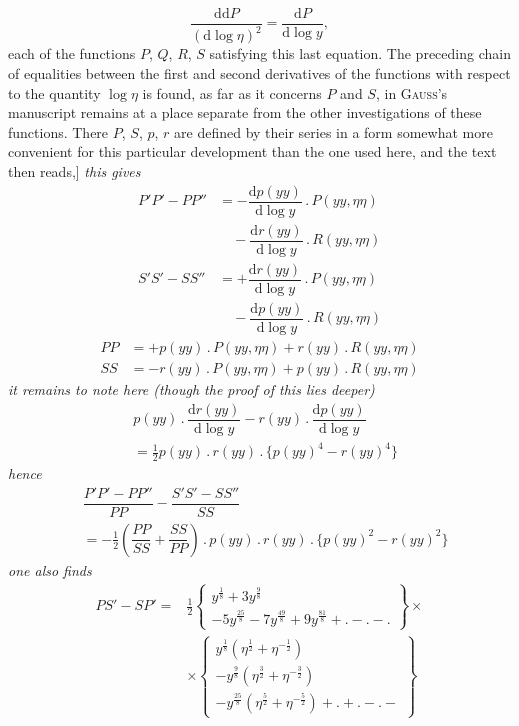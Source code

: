 
\[
\dfrac{\mathrm d\mathrm dP}{(\mathrm d\log\eta)^2}
 =\dfrac{\mathrm dP}{\mathrm d\log y},
\]
each of the functions $P$, $Q$, $R$, $S$ satisfying this last equation. The preceding chain of equalities between the first and second derivatives of the functions with respect to the quantity $\log\eta$ is found, as far as it concerns $P$ and $S$, in \textsc{Gauss}'s manuscript remains at a place separate from the other investigations of these functions. There $P$, $S$, $p$, $r$ are defined by their series in a form somewhat more convenient for this particular development than the one used here, 
and the text then reads,] \textit{this gives}
\[
\begin{aligned}
P'P'-PP''&=-\dfrac{\mathrm dp(yy)}{\mathrm d\log y}\mathbin{.}P(yy,\eta\eta)\\[5pt]&\quad{}-
\dfrac{\mathrm dr(yy)}{\mathrm d\log y}\mathbin{.}R(yy,\eta\eta)\\[9pt]
S'S'-SS''&=+\dfrac{\mathrm dr(yy)}{\mathrm d\log y}\mathbin{.}P(yy,\eta\eta)\\[5pt]&\quad{}-
\dfrac{\mathrm dp(yy)}{\mathrm d\log y}\mathbin{.}R(yy,\eta\eta)
\end{aligned}
\]
\[
\begin{aligned}
PP&=+p(yy)\mathbin{.}P(yy,\eta\eta)+r(yy)\mathbin{.}R(yy,\eta\eta)\\
SS&=-r(yy)\mathbin{.}P(yy,\eta\eta)+p(yy)\mathbin{.}R(yy,\eta\eta)
\end{aligned}
\]
\textit{it remains to note here (though the proof of this lies deeper)}
\[
\begin{aligned}&p(yy)\mathbin{.}\dfrac{\mathrm dr(yy)}{\mathrm d\log y}
-r(yy)\mathbin{.}\dfrac{\mathrm dp(yy)}{\mathrm d\log y}
\\[6pt]&=\tfrac12p(yy)\mathbin{.}r(yy)\mathbin{.}\{p(yy)^4-r(yy)^4\}\end{aligned}
\]
\textit{hence}
\[
\begin{aligned}&\dfrac{P'P'-PP''}{PP}-\dfrac{S'S'-SS''}{SS}
\\[6pt]&=-\tfrac12\left(\dfrac{PP}{SS}+\dfrac{SS}{PP}\right)
\mathbin{.}p(yy)\mathbin{.}r(yy)\mathbin{.}\{p(yy)^2-r(yy)^2\}\end{aligned}
\]
\textit{one also finds}
\[
\begin{aligned}
PS'-SP'={}&\tfrac12\left\{\begin{gathered}y^{\frac18}+3y^{\frac98}\\[3pt]-5y^{\frac{25}8}
 -7y^{\frac{49}8}+9y^{\frac{81}8}+\mathord{.}-\mathord{.}-\mathord{.}\end{gathered}\right\}\times\\[10pt]
&\times\left\{\begin{gathered}y^{\frac18}(\eta^{\frac12}+\eta^{-\frac12})
\\[3pt]-y^{\frac98}(\eta^{\frac32}+\eta^{-\frac32})
\\[3pt]-y^{\frac{25}8}(\eta^{\frac52}+\eta^{-\frac52})
 +\mathord{.}+\mathord{.}-\mathord{.}-\end{gathered}\right\}
\end{aligned}
\]
